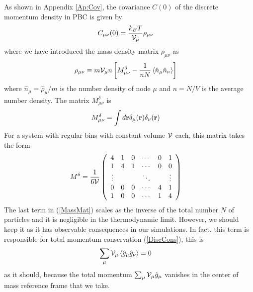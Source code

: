 \documentclass[a4paper,openright,12pt]{book}
\newcommand{\Pendiente}[1]{{\color{green}#1}} %
\newcommand{\llangle}{\left\langle}
\newcommand{\rrangle}{\right\rangle}
\begin{document}
\Pendiente{As  shown  in Appendix  \ref{Ap:Cov},  the  covariance $C(0)$  of  the
discrete momentum density in PBC is given by
\begin{align}
C_{\mu\nu}(0)&= \frac{k_BT}{{\cal V}_\mu} \rho_{\mu\nu}
\label{gg}
\end{align}
where we have introduced the mass density matrix $\rho_{\mu\nu}$ as
\begin{align}
  \rho_{\mu\nu}&\equiv  m{\cal V}_\mu n \left[ M^\delta_{\mu\nu}-
\frac{1}{n N}  \llangle \hat{n}_\mu\hat{n}_\nu\rrangle\right]
\label{MassMat}
\end{align}
where  $\hat{n}_\mu=\hat{\rho}_\mu/m$ is  the number  density  of node $\mu$ and $n=N/V$  is the  average
number density.  The
matrix $M^\delta_{\mu\nu}$ is
\begin{align}
  M^\delta_{\mu\nu}&=\int d{\bf r}\delta_\mu({\bf r})\delta_\nu({\bf r}) 
\end{align}
For a system  with regular bins with constant volume  ${\cal V}$ each,
this matrix takes the form
\begin{align}
{M}^\delta&=\frac{1}{6{\cal V}}
\left(\begin{array}{cccccc}
4&1&0&\cdots &0&1\\
1&4&1&\cdots &0&0\\
\vdots&&&\ddots&&\vdots\\
0&0&0&\cdots &4&1\\
1&0&0&\cdots&1&4
\end{array}\right)
\end{align}
The last  term in (\ref{MassMat}) scales  as the inverse of  the total
number  $N$ of  particles and  it is  negligible in  the thermodynamic
limit.  However, we  should keep it as it  has observable consequences
in  our simulations.   In fact,  this  term is  responsible for  total
momentum conservation (\ref{DiscCons}), this is
\begin{align}
  \sum_\mu{\cal V}_\mu\llangle \hat{g}_\mu\hat{g}_\nu\rrangle &=0
\end{align}
as   it   should,   because    the   total   momentum   $\sum_\mu{\cal
  V}_\mu\hat{g}_\mu$ vanishes  in the  center of mass  reference frame
that we take.
} %
\end{document}
